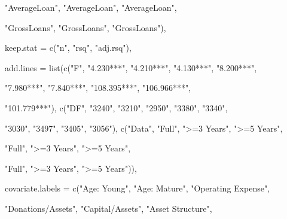\documentclass[a4paper,nobind]{templates/ociamthesis}
\newenvironment{Shaded}{\begin{snugshade}}{\end{snugshade}}
\newcommand{\AttributeTok}[1]{\textcolor[rgb]{0.77,0.63,0.00}{#1}}
\newcommand{\FunctionTok}[1]{\textcolor[rgb]{0.00,0.00,0.00}{#1}}
\newcommand{\NormalTok}[1]{#1}
\newcommand{\StringTok}[1]{\textcolor[rgb]{0.31,0.60,0.02}{#1}}
\renewenvironment{Shaded}
{
  \vspace{10pt}%
  \begin{snugshade}%
}{%
  \end{snugshade}%
  \vspace{8pt}%
}
\begin{document}
\begin{landscape}
\begin{Shaded}
\begin{Highlighting}[]
                  \StringTok{"AverageLoan"}\NormalTok{, }\StringTok{"AverageLoan"}\NormalTok{, }\StringTok{"AverageLoan"}\NormalTok{, }
                  
                  \StringTok{"GrossLoans"}\NormalTok{, }\StringTok{"GrossLoans"}\NormalTok{, }\StringTok{"GrossLoans"}\NormalTok{), }

\AttributeTok{keep.stat =} \FunctionTok{c}\NormalTok{(}\StringTok{"n"}\NormalTok{, }\StringTok{"rsq"}\NormalTok{, }\StringTok{"adj.rsq"}\NormalTok{),}


\AttributeTok{add.lines =} \FunctionTok{list}\NormalTok{(}\FunctionTok{c}\NormalTok{(}\StringTok{"F"}\NormalTok{, }\StringTok{"4.230***"}\NormalTok{, }\StringTok{"4.210***"}\NormalTok{, }\StringTok{"4.130***"}\NormalTok{, }\StringTok{"8.200***"}\NormalTok{, }
                   
                   \StringTok{"7.980***"}\NormalTok{, }\StringTok{"7.840***"}\NormalTok{, }\StringTok{"108.395***"}\NormalTok{, }\StringTok{"106.966***"}\NormalTok{, }
                   
                   \StringTok{"101.779***"}\NormalTok{), }\FunctionTok{c}\NormalTok{(}\StringTok{"DF"}\NormalTok{, }\StringTok{"3240"}\NormalTok{, }\StringTok{"3210"}\NormalTok{, }\StringTok{"2950"}\NormalTok{, }\StringTok{"3380"}\NormalTok{, }\StringTok{"3340"}\NormalTok{, }
                                    
                                    \StringTok{"3030"}\NormalTok{, }\StringTok{"3497"}\NormalTok{, }\StringTok{"3405"}\NormalTok{, }\StringTok{"3056"}\NormalTok{),}
                 \FunctionTok{c}\NormalTok{(}\StringTok{"Data"}\NormalTok{, }\StringTok{"Full"}\NormalTok{, }\StringTok{"\textgreater{}=3 Years"}\NormalTok{, }\StringTok{"\textgreater{}=5 Years"}\NormalTok{, }
                   
                   \StringTok{"Full"}\NormalTok{, }\StringTok{"\textgreater{}=3 Years"}\NormalTok{, }\StringTok{"\textgreater{}=5 Years"}\NormalTok{, }
                   
                   \StringTok{"Full"}\NormalTok{, }\StringTok{"\textgreater{}=3 Years"}\NormalTok{, }\StringTok{"\textgreater{}=5 Years"}\NormalTok{)),}

\AttributeTok{covariate.labels =} \FunctionTok{c}\NormalTok{(}\StringTok{"Age: Young"}\NormalTok{, }\StringTok{"Age: Mature"}\NormalTok{, }\StringTok{"Operating Expense"}\NormalTok{, }
                     
                     \StringTok{"Donations/Assets"}\NormalTok{, }\StringTok{"Capital/Assets"}\NormalTok{, }\StringTok{"Asset Structure"}\NormalTok{, }
                     

\end{Highlighting}
\end{Shaded}
\end{landscape}
\end{document}
